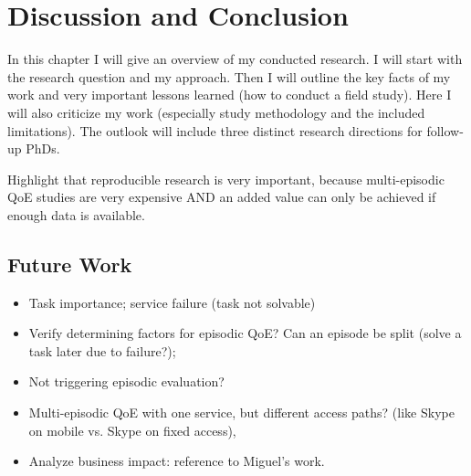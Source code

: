 \chapter{Discussion and Conclusion}\label{chap:discussion}
\begin{chapter-abstract}
In this chapter I will give an overview of my conducted research.
I will start with the research question and my approach.
Then I will outline the key facts of my work and very important lessons learned (how to conduct a field study).
Here I will also criticize my work (especially study methodology and the included limitations).
The outlook will include three distinct research directions for follow-up PhDs.

Highlight that reproducible research is very important, because multi-episodic QoE studies are very expensive AND an added value can only be achieved if enough data is available.
\end{chapter-abstract}

\section{Future Work}
\begin{itemize}
\item Task importance; service failure (task not solvable)
\item Verify determining factors for episodic QoE? Can an episode be split (solve a task later due to failure?);
\item Not triggering episodic evaluation?
\item Multi-episodic QoE with one service, but different access paths? (like Skype on mobile vs. Skype on fixed access), 

\item Analyze business impact: reference to Miguel's work.
\end{itemize}